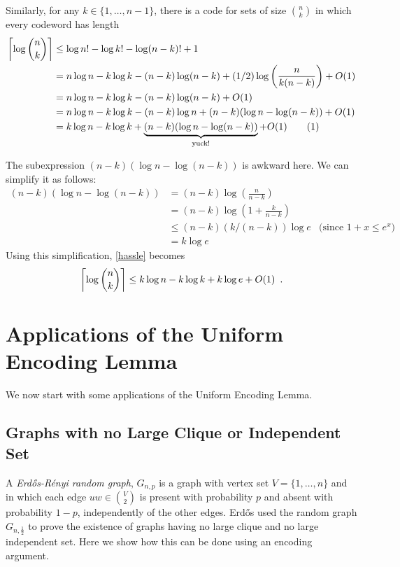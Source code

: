 \documentclass[lotsofwhite]{patmorin}
\newcommand\numberthis{\addtocounter{equation}{1}\tag{\theequation}}
\begin{document}
Similarly, for any $k\in\{1,\ldots,n-1\}$, there is a code for sets of 
size $\binom{n}{k}$ in which every codeword has length
\begin{align*}
  \left\lceil\log \binom{n}{k}\right\rceil 
     & \le \log n! - \log k! - \log (n-k)! + 1 \\
     & = n\log n - k\log k - (n-k)\log(n-k) + (1/2)\log\left(\frac{n}{k(n-k)}\right) + O(1) \\
     & = n\log n - k\log k - (n-k)\log(n-k) + O(1) \\
     & = n\log n - k\log k - (n-k)\log n + (n-k)(\log n-\log(n-k)) + O(1) \\
     & = k\log n - k\log k + \underbrace{(n-k)(\log n-\log(n-k))}_\text{yuck!}  + O(1) 
         \numberthis \eqlabel{hassle} \\ 
\end{align*}

The subexpression $(n-k)(\log n-\log(n-k))$ is awkward here. We can
simplify it as follows:
\begin{align*}
   (n-k)(\log n-\log(n-k))
      & = (n-k)\log \left(\frac{n}{n-k}\right) \\
      & = (n-k)\log \left(1+\frac{k}{n-k}\right) \\
      & \le (n-k)(k/(n-k))\log e & \text{(since $1+x \le e^x$)} \\
      & = k\log e 
\end{align*}
Using this simplification, \eqref{hassle} becomes
\begin{equation}
  \left\lceil\log \binom{n}{k}\right\rceil 
    \le k\log n - k\log k + k\log e + O(1) \eqlabel{log-n-choose-k}
     \enspace .
\end{equation} 


\section{Applications of the Uniform Encoding Lemma}

We now start with some applications of the Uniform Encoding Lemma.

\subsection{Graphs with no Large Clique or Independent Set}


A \emph{Erd\H{o}s-R\'enyi random graph}, $G_{n,p}$ is a graph with vertex
set $V=\{1,\ldots,n\}$ and in which each edge $uw\in \binom{V}{2}$
is present with probability $p$ and absent with probability $1-p$,
independently of the other edges.  Erd\H{o}s \cite{X} used the random
graph $G_{n,\frac{1}{2}}$ to prove the existence of graphs having no
large clique and no large independent set. Here we show how this can be
done using an encoding argument.
\end{document}
